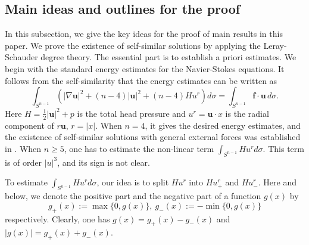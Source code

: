 \documentclass[12pt]{amsart}
\newcommand{\Bu}{{\boldsymbol{u}}}
\newcommand{\Bf}{{\boldsymbol{f}}}
\begin{document}
	\subsection{Main ideas and outlines for the proof}\label{sec:mainidea}
	
	
	
	
	In this subsection, we give the key ideas for the proof of main results in this paper.
	We prove  the existence of self-similar solutions by applying the Leray-Schauder degree theory. The essential part is to establish a priori estimates. 
	We begin with the standard energy estimates for the Navier-Stokes equations. It follows from the  self-similarity that the  energy estimates can be written as
	\begin{equation*}
		\int_{S^{n-1}} 
		\left(
		|\nabla \Bu|^2 +(n-4)|\Bu|^2 + (n-4)Hu^r
		\right) 
		d\sigma = 	\int_{S^{n-1}} \Bf\cdot \Bu \, d\sigma.
	\end{equation*}
	Here $H=\frac{1}{2}|\Bu|^2+p$ is the total head pressure and $u^r=\Bu\cdot x$ is the radial component of $r\Bu$, $r=|x|$.  
	When $n=4$,  it gives the desired energy estimates, and the existence of self-similar solutions with general external forces was established in \cite{Shi18}. 
	When $n\geq 5$, one has to estimate the non-linear term $\int_{S^{n-1}} H u^r d\sigma$. This term is of order $|u|^3$, and its sign is not clear.
	
	
	
	To estimate $\int_{S^{n-1}} H u^r d\sigma$, our idea is to split $H u^r$ into $H u^r_+$ and $H u^r_-$. Here and below, we denote the positive part and the negative part of a function $g(x)$ by 
	\begin{equation*}
		g_+(x) :=\max\{0, g(x)\},~g_-(x):=-\min\{0,g(x)\}
	\end{equation*}
	respectively. Clearly, one has $g(x)=g_+(x) - g_-(x)$ and $|g(x)| = g_+(x)+ g_-(x)$.
	
\end{document}
